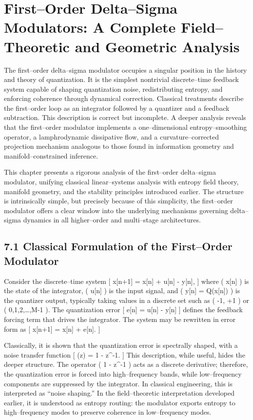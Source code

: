 \chapter{First–Order Delta–Sigma Modulators:
A Complete Field–Theoretic and Geometric Analysis}

\noindent
The first–order delta–sigma modulator occupies a singular position in the history and theory of quantization. It is the simplest nontrivial discrete–time feedback system capable of shaping quantization noise, redistributing entropy, and enforcing coherence through dynamical correction. Classical treatments describe the first–order loop as an integrator followed by a quantizer and a feedback subtraction. This description is correct but incomplete. A deeper analysis reveals that the first–order modulator implements a one–dimensional entropy–smoothing operator, a lamphrodynamic dissipative flow, and a curvature–corrected projection mechanism analogous to those found in information geometry and manifold–constrained inference.

This chapter presents a rigorous analysis of the first–order delta–sigma modulator, unifying classical linear–systems analysis with entropy field theory, manifold geometry, and the stability principles introduced earlier. The structure is intrinsically simple, but precisely because of this simplicity, the first–order modulator offers a clear window into the underlying mechanisms governing delta–sigma dynamics in all higher–order and multi–stage architectures.

\section{7.1 Classical Formulation of the First–Order Modulator}

Consider the discrete–time system
[
x[n+1] = x[n] + u[n] - y[n],
]
where ( x[n] \in {} ) is the state of the integrator, ( u[n] ) is the input signal, and ( y[n] = Q(x[n]) ) is the quantizer output, typically taking values in a discrete set such as ( {-1, +1} ) or ( {0,1,2,\ldots,M-1} ). The quantization error
[
e[n] = u[n] - y[n]
]
defines the feedback forcing term that drives the integrator. The system may be rewritten in error form as
[
x[n+1] = x[n] + e[n].
]

Classically, it is shown that the quantization error is spectrally shaped, with a noise transfer function
[
(z) = 1 - z^{-1}.
]
This description, while useful, hides the deeper structure. The operator ( 1 - z^{-1} ) acts as a discrete derivative; therefore, the quantization error is forced into high–frequency bands, while low–frequency components are suppressed by the integrator. In classical engineering, this is interpreted as “noise shaping.” In the field–theoretic interpretation developed earlier, it is understood as entropy routing: the modulator exports entropy to high–frequency modes to preserve coherence in low–frequency modes.

